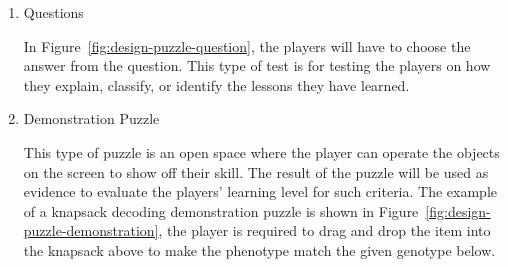 \documentclass[12pt,oneside,openright,a4paper]{cpe-english-project}
\begin{document}
\begin{enumerate}
	\item Questions  \\
	\begin{minipage}[c]{\textwidth}\centering
	\label{fig:design-puzzle-question}
	\end{minipage}
	In Figure~\ref{fig:design-puzzle-question}, the players will have to choose the answer from the question. This type of test is for testing the players on how they explain, classify, or identify the lessons they have learned.

	\item Demonstration Puzzle  \\
	\begin{minipage}[c]{\textwidth}\centering
	\label{fig:design-puzzle-demonstration}
	\end{minipage}
	This type of puzzle is an open space where the player can operate the objects on the screen to show off their skill. The result of the puzzle will be used as evidence to evaluate the players’ learning level for such criteria. The example of a knapsack decoding demonstration puzzle is shown in Figure~\ref{fig:design-puzzle-demonstration}, the player is required to drag and drop the item into the knapsack above to make the phenotype match the given genotype below.


\end{enumerate}
\end{document}
